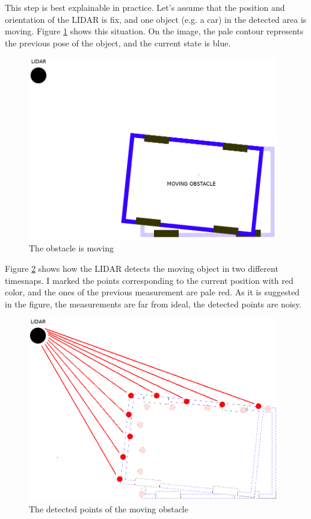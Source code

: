 This step is best explainable in practice. Let's assume that the position and orientation of the LIDAR is fix, and one object (e.g. a car) in the detected area is moving. Figure \ref{obstacle_movement} shows this situation. On the image, the pale contour represents the previous pose of the object, and the current state is blue.

\begin{figure}[!ht]
    \centering
    \includegraphics[height=80mm]{figures/raw/obstacle_movement.png}
    \caption{The obstacle is moving}
    \label{obstacle_movement}
\end{figure}

Figure \ref{obstacle_movement_lidar} shows how the LIDAR detects the moving object in two different timesnaps. I marked the points corresponding to the current position with red color, and the ones of the previous measurement are pale red. As it is suggested in the figure, the measurements are far from ideal, the detected points are noisy.

\begin{figure}[!ht]
    \centering
    \includegraphics[height=80mm]{figures/raw/obstacle_movement_lidar.png}
    \caption{The detected points of the moving obstacle}
    \label{obstacle_movement_lidar}
\end{figure}

